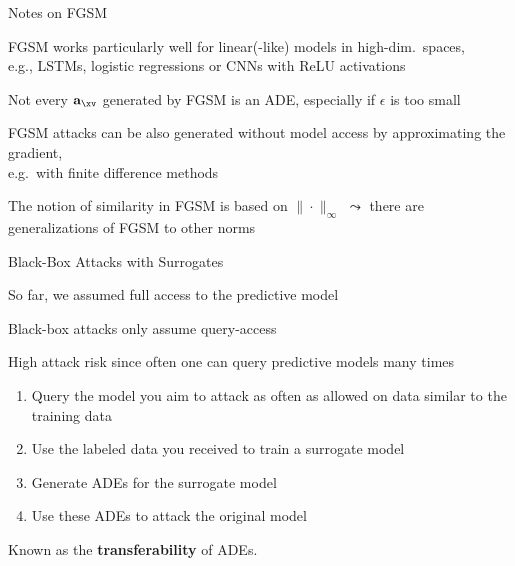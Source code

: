 \documentclass[10pt,compress,t,notes=noshow, xcolor=table]{beamer}
\begin{document}
\begin{framei}[align=top]{Notes on FGSM  }
\item FGSM works particularly well for linear(-like) models in high-dim.\ spaces,\\ e.g., LSTMs, logistic regressions or CNNs with ReLU activations
\item Not every $\mathbf{a}_{\xv}$ generated by FGSM is an ADE, especially if $\epsilon$ is too small
\item FGSM attacks can be also generated without model access by approximating the gradient,\\ e.g.\ with finite difference methods
\item The notion of similarity in FGSM is based on $\|\cdot\|_{\infty}$ $\leadsto$ there are generalizations of FGSM to other norms
\end{framei}


\begin{framev}[align=top]{Black-Box Attacks with Surrogates }
\begin{itemizeM}
\item So far, we assumed full access to the predictive model
\item Black-box attacks only assume query-access
\item High attack risk since often one can query predictive models many times
\end{itemizeM}
\spacer[0.25]
\begin{enumerate}
\item Query the model you aim to attack as often as allowed on data similar to the training data
\item Use the labeled data you received to train a surrogate model
\item Generate ADEs for the surrogate model
\item Use these ADEs to attack the original model
\end{enumerate}
\spacer[0.25]
\begin{itemizeM}
\item[$\leadsto$] Known as the \textbf{transferability} of ADEs.
\end{itemizeM}
\end{framev}
\end{document}
